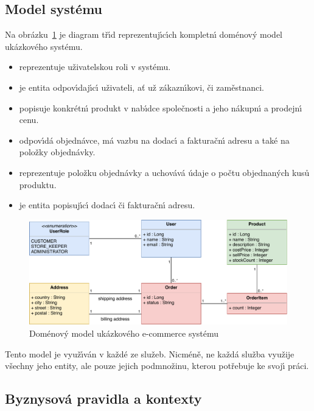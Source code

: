 \subsection{Model systému}

Na obrázku~\ref{fig:example-model} je diagram tř\'{\i}d reprezentuj\'{\i}c\'{\i}ch
kompletn\'{\i} doménov\'y model ukázkového systému.

\begin{itemize}
    \item \textbf{} reprezentuje uživatelskou roli v systému.
    \item \textbf{} je entita odpov\'{\i}daj\'{\i}c\'{\i} uživateli, ať už zákazn\'{\i}kovi, či zaměstnanci.
    \item \textbf{} popisuje konkrétn\'{\i} produkt v nab\'{\i}dce společnosti a jeho nákupn\'{\i} a prodejn\'{\i} cenu.
    \item \textbf{} odpov\'{\i}dá objednávce, má vazbu na dodac\'{\i} a fakturačn\'{\i} adresu a také na položky objednávky.
    \item \textbf{} reprezentuje položku objednávky a uchovává údaje o počtu objednan\'ych kusů produktu.
    \item \textbf{} je entita popisuj\'{\i}c\'{\i} dodac\'{\i} či fakturačn\'{\i} adresu.
\end{itemize}

\begin{figure}[ht]
    \centering
    \includegraphics[keepaspectratio=true, width=0.9\linewidth]{figures/example-model.pdf}
    \caption{Doménový model ukázkového e-commerce systému}
    \label{fig:example-model}
\end{figure}

Tento model je využ\'{\i}ván v každé ze služeb. Nicméně, ne každá služba využije všechny jeho entity,
ale pouze jejich podmnožinu, kterou potřebuje ke svoj\'{\i} práci.

\subsection{Byznysová pravidla a kontexty}

